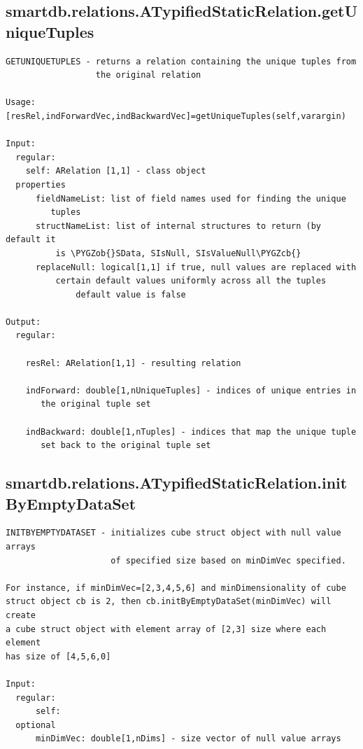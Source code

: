 \documentclass[letterpaper,10pt,english]{sphinxmanual}
\def\PYGZob{\char`\{}
\def\PYGZcb{\char`\}}
\begin{document}
\subsection{smartdb.relations.ATypifiedStaticRelation.getUniqueTuples}
\label{chap_functions:smartdb-relations-atypifiedstaticrelation-getuniquetuples}
\begin{Verbatim}[commandchars=\\\{\}]
GETUNIQUETUPLES - returns a relation containing the unique tuples from
                  the original relation

Usage: [resRel,indForwardVec,indBackwardVec]=getUniqueTuples(self,varargin)

Input:
  regular:
    self: ARelation [1,1] - class object
  properties
      fieldNameList: list of field names used for finding the unique
         tuples
      structNameList: list of internal structures to return (by default it
          is \PYGZob{}SData, SIsNull, SIsValueNull\PYGZcb{}
      replaceNull: logical[1,1] if true, null values are replaced with
          certain default values uniformly across all the tuples
              default value is false

Output:
  regular:

    resRel: ARelation[1,1] - resulting relation

    indForward: double[1,nUniqueTuples] - indices of unique entries in
       the original tuple set

    indBackward: double[1,nTuples] - indices that map the unique tuple
       set back to the original tuple set
\end{Verbatim}


\subsection{smartdb.relations.ATypifiedStaticRelation.initByEmptyDataSet}
\label{chap_functions:smartdb-relations-atypifiedstaticrelation-initbyemptydataset}
\begin{Verbatim}[commandchars=\\\{\}]
INITBYEMPTYDATASET - initializes cube struct object with null value arrays
                     of specified size based on minDimVec specified.

For instance, if minDimVec=[2,3,4,5,6] and minDimensionality of cube
struct object cb is 2, then cb.initByEmptyDataSet(minDimVec) will create
a cube struct object with element array of [2,3] size where each element
has size of [4,5,6,0]

Input:
  regular:
      self:
  optional
      minDimVec: double[1,nDims] - size vector of null value arrays
\end{Verbatim}
\end{document}
